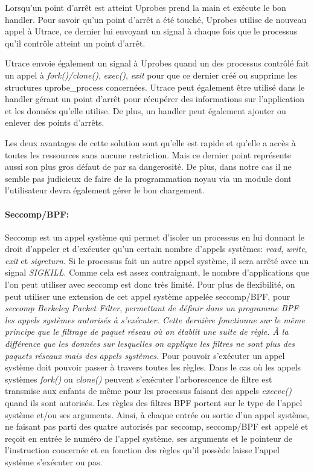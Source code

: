 Lorsqu'un point d'arrêt est atteint Uprobes prend la main et exécute le bon
handler. Pour savoir qu'un point d'arrêt a été touché, Uprobes utilise de
nouveau appel à Utrace, ce dernier lui envoyant un signal à chaque fois que le
processus qu'il contrôle atteint un point d'arrêt.

Utrace envoie également un signal à Uprobes quand un des processus contrôlé fait
un appel à \textit{fork()/clone()}, \textit{exec()}, \textit{exit} pour que ce
dernier créé ou supprime les structures uprobe\_process concernées. Utrace peut
également être utilisé dans le handler gérant un point d'arrêt pour récupérer
des informations sur l'application et les données qu'elle utilise. De plus, un
handler peut également ajouter ou enlever des points d'arrêts.

Les deux avantages de cette solution sont qu'elle est rapide et qu'elle a accès
à toutes les ressources sans aucune restriction. Mais ce dernier point
représente aussi son plus gros défaut de par sa dangerosité. De plus, dans notre
cas il ne semble pas judicieux de faire de la programmation noyau via un module
dont l'utilisateur devra également gérer le bon chargement.

\paragraph{Seccomp/BPF:}

Seccomp \citet{INTERCEPTIONseccompbpf} est un appel système qui permet d'isoler
un processus en lui donnant le droit d'appeler et d'exécuter qu'un certain
nombre d'appels systèmes: \textit{read}, \textit{write}, \textit{exit} et
\textit{sigreturn}. Si le processus fait un autre appel système, il sera arrêté
avec un signal \textit{SIGKILL}. Comme cela est assez contraignant, le nombre
d'applications que l'on peut utiliser avec seccomp est donc très limité. Pour
plus de flexibilité, on peut utiliser une extension de cet appel système appelée
seccomp/BPF, pour \textit{seccomp Berkeley Packet Filter}, \textit{permettant de définir
dans un programme BPF \citet{INTERCEPTIONbpf} les appels systèmes autorisés à
s'exécuter. Cette dernière fonctionne sur le même principe que le filtrage de
paquet réseau où on établit une suite de règle. À la différence que les données
sur lesquelles on applique les filtres ne sont plus des paquets réseaux mais des
appels systèmes.} Pour pouvoir s'exécuter un appel système doit pouvoir passer à
travers toutes les règles. Dans le cas où les appels systèmes \textit{fork()} ou
\textit{clone()} peuvent s'exécuter l'arborescence de filtre est transmise aux
enfants de même pour les processus faisant des appels \textit{execve()} quand
ils sont autorisés. Les règles des filtres BPF portent sur le type de l'appel
système et/ou ses arguments. Ainsi, à chaque entrée ou sortie d'un appel
système, ne faisant pas parti des quatre autorisés par seccomp, seccomp/BPF est
appelé et reçoit en entrée le numéro de l'appel système, ses arguments et le
pointeur de l'instruction concernée et en fonction des règles qu'il possède
laisse l'appel système s'exécuter ou pas.

